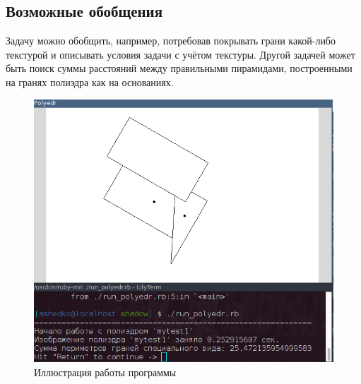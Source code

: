 \subsection{Возможные обобщения}
Задачу можно обобщить, например, потребовав покрывать грани какой-либо текстурой и описывать условия задачи с учётом текстуры. Другой задачей может быть поиск суммы расстояний между правильными пирамидами, построенными на гранях полиэдра как на основаниях.

\begin{figure}[ht!]
\begin{center}
\includegraphics[scale=0.8]{images/poly_1.png}
\caption{Иллюстрация работы программы} \label{fig:poly_fig}
\end{center}
\end{figure}